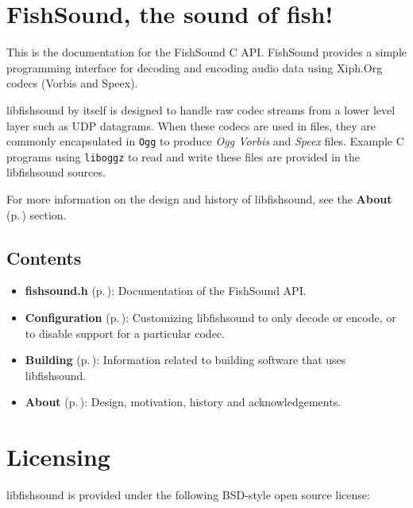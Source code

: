 \section{Fish\-Sound, the sound of fish!}\label{intro}
This is the documentation for the Fish\-Sound C API. Fish\-Sound provides a simple programming interface for decoding and encoding audio data using Xiph.Org codecs (Vorbis and Speex).

libfishsound by itself is designed to handle raw codec streams from a lower level layer such as UDP datagrams. When these codecs are used in files, they are commonly encapsulated in {\tt Ogg} to produce {\em Ogg Vorbis\/} and {\em Speex\/} files. Example C programs using {\tt liboggz} to read and write these files are provided in the libfishsound sources.

For more information on the design and history of libfishsound, see the {\bf About }{\rm (p.\,\pageref{group__about})} section.\subsection{Contents}\label{contents}
\begin{itemize}
\item {\bf fishsound.h }{\rm (p.\,\pageref{fishsound_8h})}: Documentation of the Fish\-Sound API.\end{itemize}


\begin{itemize}
\item {\bf Configuration }{\rm (p.\,\pageref{group__configuration})}: Customizing libfishsound to only decode or encode, or to disable support for a particular codec.\end{itemize}


\begin{itemize}
\item {\bf Building }{\rm (p.\,\pageref{group__building})}: Information related to building software that uses libfishsound.\end{itemize}


\begin{itemize}
\item {\bf About }{\rm (p.\,\pageref{group__about})}: Design, motivation, history and acknowledgements.\end{itemize}
\section{Licensing}\label{Licensing}
libfishsound is provided under the following BSD-style open source license:




